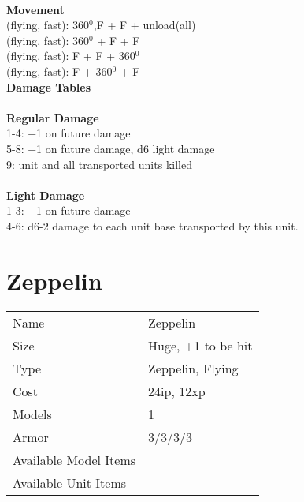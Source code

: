 \ \\ {\bf Movement } \\
(flying, fast): 360$^0$,F + F + unload(all) \\
(flying, fast): 360$^0$ + F + F \\
(flying, fast): F + F + 360$^0$  \\
(flying, fast): F + 360$^0$ + F \\



{\bf Damage Tables} \\
\ \\ {\bf Regular Damage } \\
1-4: +1 on future damage \\
5-8: +1 on future damage, d6 light damage \\
9: unit and all transported units killed \\
\ \\ {\bf Light Damage } \\
1-3: +1 on future damage \\
4-6: d6-2 damage to each unit base transported by this unit. \\









\pagebreak

\section{ Zeppelin }

\begin{tabular}{ll}
  Name & Zeppelin \\
  Size & Huge, +1 to be hit\\
  Type & Zeppelin, Flying\\
  Cost & 24ip, 12xp\\
  Models & 1\\
  Armor & 3/3/3/3\\
  Available Model Items &  \\
  Available Unit Items &  \\
\end{tabular}

